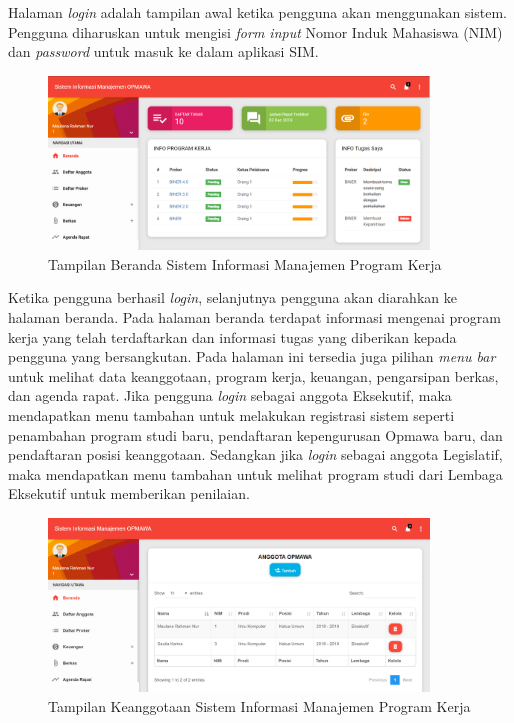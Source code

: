 Halaman \textit{login} adalah tampilan awal ketika pengguna akan menggunakan sistem. Pengguna diharuskan untuk mengisi \textit{form input} Nomor Induk Mahasiswa (NIM) dan \textit{password} untuk masuk ke dalam aplikasi SIM. 

\begin{figure}[H]
	\centering
	\includegraphics[width=0.9\textwidth]{gambar/interface_home}
	\caption{ Tampilan Beranda Sistem Informasi Manajemen Program Kerja}
	\label{Tampilan_Home}
\end{figure}

Ketika pengguna berhasil \textit{login}, selanjutnya pengguna akan diarahkan ke halaman beranda. Pada halaman beranda terdapat informasi mengenai program kerja yang telah terdaftarkan dan informasi tugas yang diberikan kepada pengguna yang bersangkutan. Pada halaman ini tersedia juga pilihan \textit{menu bar} untuk melihat data keanggotaan, program kerja, keuangan, pengarsipan berkas, dan agenda rapat. Jika pengguna \textit{login} sebagai anggota Eksekutif, maka mendapatkan menu tambahan untuk melakukan registrasi sistem seperti penambahan program studi baru, pendaftaran kepengurusan Opmawa baru, dan pendaftaran posisi keanggotaan. Sedangkan jika \textit{login} sebagai anggota Legislatif, maka mendapatkan menu tambahan untuk melihat program studi dari Lembaga Eksekutif untuk memberikan penilaian.

\begin{figure}[H]
	\centering
	\includegraphics[width=0.9\textwidth]{gambar/interface_anggota}
	\caption{ Tampilan Keanggotaan Sistem Informasi Manajemen Program Kerja}
	\label{Tampilan_Anggota}
\end{figure}

